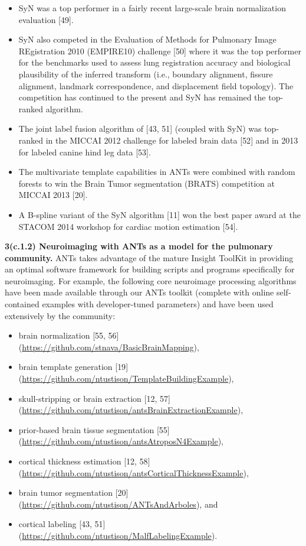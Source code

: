 \documentclass[11pt,]{article}
\begin{document}
\begin{itemize}
\itemsep1pt\parskip0pt
\item
  SyN was a top performer in a fairly recent large-scale brain
  normalization evaluation {[}49{]}.
\item
  SyN also competed in the Evaluation of Methods for Pulmonary Image
  REgistration 2010 (EMPIRE10) challenge {[}50{]} where it was the top
  performer for the benchmarks used to assess lung registration accuracy
  and biological plausibility of the inferred transform (i.e., boundary
  alignment, fissure alignment, landmark correspondence, and
  displacement field topology). The competition has continued to the
  present and SyN has remained the top-ranked algorithm.
\item
  The joint label fusion algorithm of {[}43, 51{]} (coupled with SyN)
  was top-ranked in the MICCAI 2012 challenge for labeled brain data
  {[}52{]} and in 2013 for labeled canine hind leg data {[}53{]}.
\item
  The multivariate template capabilities in ANTs were combined with
  random forests to win the Brain Tumor segmentation (BRATS) competition
  at MICCAI 2013 {[}20{]}.
\item
  A B-spline variant of the SyN algorithm {[}11{]} won the best paper
  award at the STACOM 2014 workshop for cardiac motion estimation
  {[}54{]}.
\end{itemize}

\textbf{3(c.1.2) Neuroimaging with ANTs as a model for the pulmonary
community.} ANTs takes advantage of the mature Insight ToolKit in
providing an optimal software framework for building scripts and
programs specifically for neuroimaging. For example, the following core
neuroimage processing algorithms have been made available through our
ANTs toolkit (complete with online self-contained examples with
developer-tuned parameters) and have been used extensively by the
community:

\begin{itemize}
\itemsep1pt\parskip0pt
\item
  brain normalization {[}55, 56{]}
  (\url{https://github.com/stnava/BasicBrainMapping}),
\item
  brain template generation {[}19{]}
  (\url{https://github.com/ntustison/TemplateBuildingExample}),
\item
  skull-stripping or brain extraction {[}12, 57{]}
  (\url{https://github.com/ntustison/antsBrainExtractionExample}),
\item
  prior-based brain tissue segmentation {[}55{]}
  (\url{https://github.com/ntustison/antsAtroposN4Example}),
\item
  cortical thickness estimation {[}12, 58{]}
  (\url{https://github.com/ntustison/antsCorticalThicknessExample}),
\item
  brain tumor segmentation {[}20{]}
  (\url{https://github.com/ntustison/ANTsAndArboles}), and
\item
  cortical labeling {[}43, 51{]}
  (\url{https://github.com/ntustison/MalfLabelingExample}).
\end{itemize}
\end{document}
